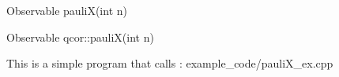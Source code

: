 
\begin{apidefinition}

\begin{Csynopsis}
    Observable pauliX(int n)
\end{Csynopsis}

\begin{Cppsynopsis}
    Observable qcor::pauliX(int n)
\end{Cppsynopsis}


\begin{apiarguments}
\end{apiarguments}



\apinotes{
    
}

\begin{apiexamples}

\apicppexample
    { This is a simple program that calls : } 
    { example_code/pauliX_ex.cpp} 
    {}
\end{apiexamples}

\end{apidefinition}
